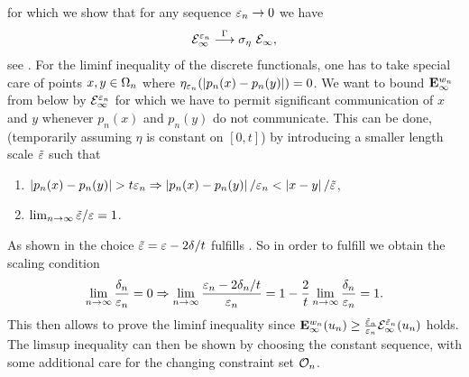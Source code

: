 %
for which we show that for any sequence $\varepsilon_n\to 0$ we have
\begin{align*}
\mathcal{E}^{\varepsilon_n}_\infty\overset{\Gamma}{\longrightarrow} \sigma_{\eta}~\mathcal{E}_\infty,
\end{align*}
%
see \cite[Thm. 4]{roith2022continuum}. For the liminf inequality of the discrete functionals, one has to take special care of points $x,y\in\Omega_n$ where $\eta_{\varepsilon_n}(\left|p_n(x) - p_n(y)\right|)=0$. We want to bound $\mathbf{E}^{w_n}_\infty$ from below by $\mathcal{E}_\infty^{\varepsilon_n}$ for which we have to permit significant communication of $x$ and $y$ whenever $p_n(x)$  and $p_n(y)$ do not communicate. This can be done, (temporarily assuming $\eta$ is constant on $[0,t]$) by introducing a smaller length scale $\tilde{\varepsilon}$ such that
%
\begin{enumerate}[label=(\roman*)]
\item\label{ga} $\left|p_n(x) - p_n(y)\right| > t\varepsilon_n\Rightarrow \left|p_n(x) - p_n(y)\right|/\varepsilon_n < \left|x-y\right|/\tilde{\varepsilon}$,
\item\label{gb} $\lim_{n\to\infty} \tilde{\varepsilon}/\varepsilon=1$.
\end{enumerate}
%
As shown in \cite{roith2022continuum} the choice $\tilde{\varepsilon}= \varepsilon - 2 \delta/t$ fulfills . So in order to fulfill 
 we obtain the scaling condition
%
\begin{align*}
\lim_{n\to\infty} \frac{\delta_n}{\varepsilon_n} = 0\Rightarrow \lim_{n\to\infty} \frac{\varepsilon_n - 2 \delta_n/t}{\varepsilon_n} = 1 - \frac{2}{t} \lim_{n\to\infty} \frac{\delta_n}{\varepsilon_n} = 1.
\end{align*}
%
This then allows to prove the liminf inequality since $\mathbf{E}^{w_n}_\infty(u_n)\geq \frac{\tilde{\varepsilon}_n}{\varepsilon_n} \mathcal{E}^{\tilde{\varepsilon}_n}_\infty(u_n)$ holds. The limsup inequality can then be shown by choosing the constant sequence, with some additional care for the changing constraint set $\mathcal{O}_n$.
%
%
